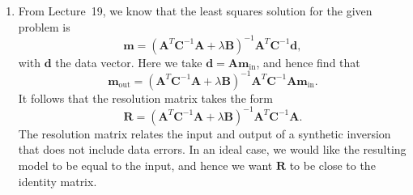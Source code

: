 \documentclass[a4paper,10pt]{paper}
\begin{document}
\begin{enumerate}
\begin{enumerate}
the zone produces a gap in the travel-time curve (a shadow zone), $\Delta(q)$ jumping discontinuously as $q$ passes the value at the top of the zone, and the depths inferred below it are in error unless the 
zone is accounted for separately. At a discontinuity across which the velocity increases with depth, $\eta$ jumps downwards and there 
is a range of ray parameters for which the rays are totally reflected at the interface. Rays turning just beneath it emerge at larger epicentral 
angles than those turning just above, so the travel-time curve folds back on itself to form a \emph{triplication}: over a range of $\Delta$ 
three arrivals are seen, and $q(\Delta)$ is multi-valued. The inversion remains valid provided the branches are correctly identified, 
since $\Delta(q)$ itself remains single-valued.

\end{enumerate}

\item From Lecture~19, we know that the least squares solution for the given problem is
\begin{equation*}
    \mathbf{m}=(\mathbf{A}^{T}\mathbf{C}^{-1}\mathbf{A}+\lambda \mathbf{B})^{-1}\mathbf{A}^{T}\mathbf{C}^{-1}\mathbf{d},
\end{equation*}
with $\mathbf{d}$ the data vector. Here we take $\mathbf{d}=\mathbf{A}\mathbf{m}_{\mathrm{in}}$, and hence find that
\begin{equation*}
    \mathbf{m}_{\mathrm{out}}=(\mathbf{A}^{T}\mathbf{C}^{-1}\mathbf{A}+\lambda \mathbf{B})^{-1}\mathbf{A}^{T}\mathbf{C}^{-1}\mathbf{A}\mathbf{m}_{\mathrm{in}}.
\end{equation*}
It follows that the resolution matrix takes the form
\begin{equation*}
    \mathbf{R}=(\mathbf{A}^{T}\mathbf{C}^{-1}\mathbf{A}+\lambda \mathbf{B})^{-1}\mathbf{A}^{T}\mathbf{C}^{-1}\mathbf{A}.
\end{equation*}
The resolution matrix relates the input and output of a synthetic inversion that does not include data errors. In an ideal case, we would like the resulting model to be equal to the input, and hence we want $\mathbf{R}$ to be close to the identity matrix.


\end{enumerate}
\end{document}

